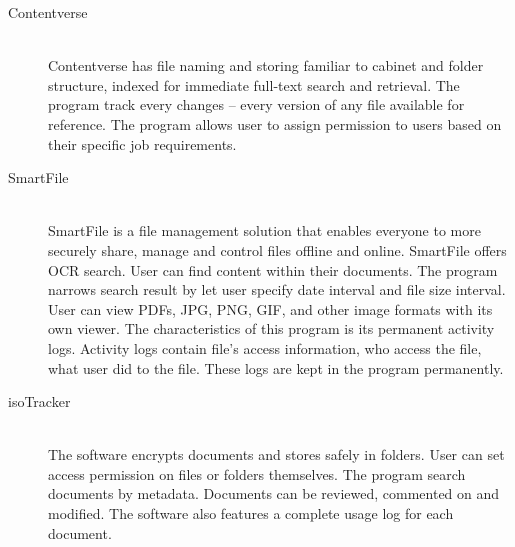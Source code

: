 \begin{description}
\item[Contentverse] \hfill \\
Contentverse has file naming and storing familiar to cabinet and folder structure, indexed for immediate full-text search and retrieval.
The program track every changes -- every version of any file available for reference.
The program allows user to assign permission to users based on their specific job requirements.

\item[SmartFile] \hfill \\
SmartFile is a file management solution that enables everyone to more securely share, manage and control files offline and online.
SmartFile offers \gls{OCR} search.
User can find content within their documents.
The program narrows search result by let user specify date interval and file size interval.
User can view PDFs, JPG, PNG, GIF, and other image formats with its own viewer.
The characteristics of this program is its permanent activity logs.
Activity logs contain file's access information, who access the file, what user did to the file.
These logs are kept in the program permanently.

\item[isoTracker] \hfill \\
The software encrypts documents and stores safely in folders.
User can set access permission on files or folders themselves.
The program search documents by metadata.
Documents can be reviewed, commented on and modified. The software also features a complete usage log for each document.


\end{description}